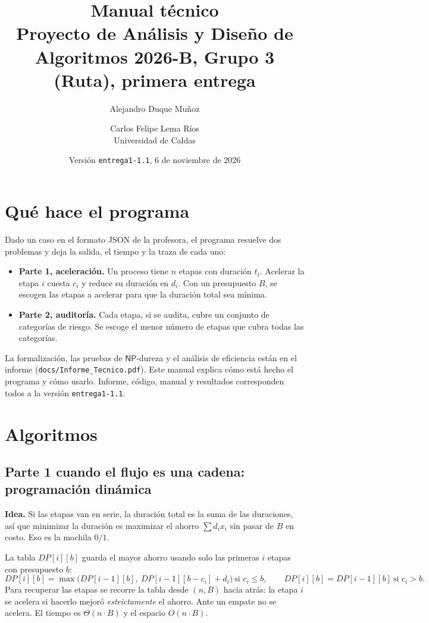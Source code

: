 \documentclass[11pt,a4paper]{article}
\title{Manual técnico\\[0.3em]
\large Proyecto de Análisis y Diseño de Algoritmos 2026-B, Grupo 3 (Ruta), primera entrega}
\author{Alejandro Duque Muñoz \and Carlos Felipe Lema Ríos\\[0.3em] Universidad de Caldas}
\date{Versión \texttt{entrega1-1.1}, 6 de noviembre de 2026}
\newcommand{\NP}{\mathsf{NP}}
\begin{document}
\maketitle

\section{Qué hace el programa}

Dado un caso en el formato JSON de la profesora, el programa resuelve dos problemas y deja la salida, el tiempo y la traza de cada uno:

\begin{itemize}[nosep]
  \item \textbf{Parte 1, aceleración.} Un proceso tiene $n$ etapas con duración $t_i$. Acelerar la etapa $i$ cuesta $c_i$ y reduce su duración en $d_i$. Con un presupuesto $B$, se escogen las etapas a acelerar para que la duración total sea mínima.
  \item \textbf{Parte 2, auditoría.} Cada etapa, si se audita, cubre un conjunto de categorías de riesgo. Se escoge el menor número de etapas que cubra todas las categorías.
\end{itemize}

La formalización, las pruebas de $\NP$-dureza y el análisis de eficiencia están en el informe (\texttt{docs/Informe\_Tecnico.pdf}). Este manual explica cómo está hecho el programa y cómo usarlo. Informe, código, manual y resultados corresponden todos a la versión \texttt{entrega1-1.1}.

\section{Algoritmos}

\subsection{Parte 1 cuando el flujo es una cadena: programación dinámica}

\textbf{Idea.} Si las etapas van en serie, la duración total es la suma de las duraciones, así que minimizar la duración es maximizar el ahorro $\sum d_ix_i$ sin pasar de $B$ en costo. Eso es la mochila $0/1$.

La tabla $DP[i][b]$ guarda el mayor ahorro usando solo las primeras $i$ etapas con presupuesto $b$:
\[
DP[i][b]=\max\bigl(DP[i-1][b],\ DP[i-1][b-c_i]+d_i\bigr)\ \text{si } c_i\le b,\qquad DP[i][b]=DP[i-1][b]\ \text{si } c_i>b .
\]
Para recuperar las etapas se recorre la tabla desde $(n,B)$ hacia atrás: la etapa $i$ se acelera si hacerlo mejoró \emph{estrictamente} el ahorro. Ante un empate no se acelera. El tiempo es $\Theta(n\cdot B)$ y el espacio $O(n\cdot B)$.
\end{document}
